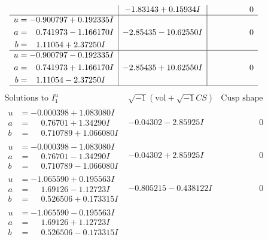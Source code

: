 \documentclass[1p]{elsarticle_modified}
\theoremstyle{definition}
\newcommand{\I}{\sqrt{-1}}
\begin{document}
$$\begin{array}{c|c|c}
 & -1.83143 + 0.15934 I & \phantom{-0.000000 } 0 \\ \hline\begin{aligned}
u &= -0.900797 + 0.192335 I \\
a &= \phantom{-}0.741973 - 1.166170 I \\
b &= \phantom{-}1.11054 + 2.37250 I\end{aligned}
 & -2.85435 - 10.62550 I & \phantom{-0.000000 } 0 \\ \hline\begin{aligned}
u &= -0.900797 - 0.192335 I \\
a &= \phantom{-}0.741973 + 1.166170 I \\
b &= \phantom{-}1.11054 - 2.37250 I\end{aligned}
 & -2.85435 + 10.62550 I & \phantom{-0.000000 } 0\\
 \hline 
 \end{array}$$\newpage$$\begin{array}{c|c|c}  
\text{Solutions to }I^u_{1}& \I (\text{vol} + \sqrt{-1}CS) & \text{Cusp shape}\\
 \hline 
\begin{aligned}
u &= -0.000398 + 1.083080 I \\
a &= \phantom{-}0.76701 + 1.34290 I \\
b &= \phantom{-}0.710789 + 1.066080 I\end{aligned}
 & -0.04302 - 2.85925 I & \phantom{-0.000000 } 0 \\ \hline\begin{aligned}
u &= -0.000398 - 1.083080 I \\
a &= \phantom{-}0.76701 - 1.34290 I \\
b &= \phantom{-}0.710789 - 1.066080 I\end{aligned}
 & -0.04302 + 2.85925 I & \phantom{-0.000000 } 0 \\ \hline\begin{aligned}
u &= -1.065590 + 0.195563 I \\
a &= \phantom{-}1.69126 - 1.12723 I \\
b &= \phantom{-}0.526506 + 0.173315 I\end{aligned}
 & -0.805215 - 0.438122 I & \phantom{-0.000000 } 0 \\ \hline\begin{aligned}
u &= -1.065590 - 0.195563 I \\
a &= \phantom{-}1.69126 + 1.12723 I \\
b &= \phantom{-}0.526506 - 0.173315 I\end{aligned}

\end{array}$$
\end{document}
